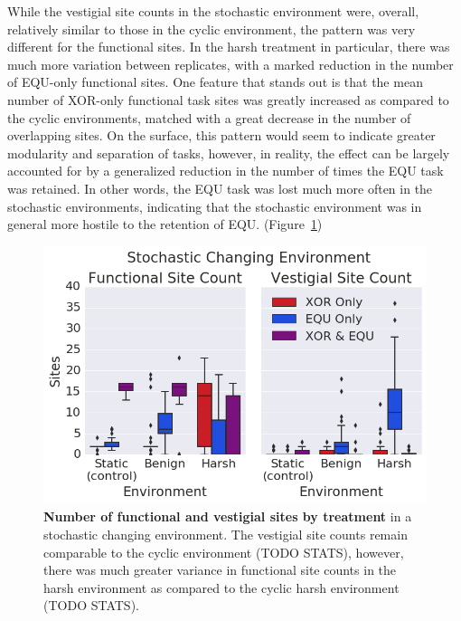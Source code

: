 \documentclass[letterpaper]{article}
\begin{document}
While the vestigial site counts in the stochastic environment were, overall, relatively similar to those in the cyclic environment, the pattern was very different for the functional sites. In the harsh treatment in particular, there was much more variation between replicates, with a marked reduction in the number of EQU-only functional sites. One feature that stands out is that the mean number of XOR-only functional task sites was greatly increased as compared to the cyclic environments, matched with a great decrease in the number of overlapping sites. On the surface, this pattern would seem to indicate greater modularity and separation of tasks, however, in reality, the effect can be largely accounted for by a generalized reduction in the number of times the EQU task was retained. In other words, the EQU task was lost much more often in the stochastic environments, indicating that the stochastic environment was in general more hostile to the retention of EQU.  
(Figure~\ref{fig:CSE_func_vestigial})

\begin{figure}[h!]
\begin{center}
\includegraphics[trim={0 0 0 0}, clip, width=1\columnwidth]{figures/CSE_func_vest__box.png}
\caption{\textbf{Number of functional and vestigial sites by treatment} in a stochastic changing environment. The vestigial site counts remain comparable to the cyclic environment (TODO STATS), however, there was much greater variance in functional site counts in the harsh environment as compared to the cyclic harsh environment (TODO STATS).%
}
\label{fig:CSE_func_vestigial} %
\end{center}
\end{figure}
\end{document}
